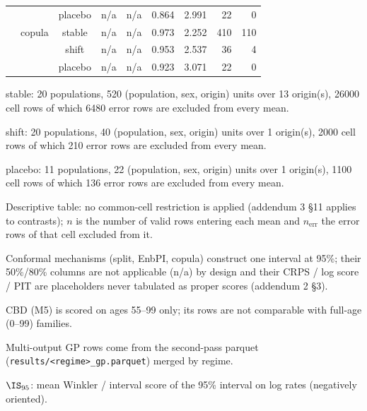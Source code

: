 {\begin{longtable}{@{}llcrrrrrr@{}}
 &  & placebo & n/a & n/a & 0.864 & 2.991 & 22 & 0 \\
 & copula & stable & n/a & n/a & 0.973 & 2.252 & 410 & 110 \\
 &  & shift & n/a & n/a & 0.953 & 2.537 & 36 & 4 \\
 &  & placebo & n/a & n/a & 0.923 & 3.071 & 22 & 0 \\
\end{longtable}
\noindent\begin{minipage}{\linewidth}\scriptsize\raggedright
\noindent stable: 20 populations, 520 (population, sex, origin) units over 13 origin(s), 26000 cell rows of which 6480 error rows are excluded from every mean.\par
\noindent shift: 20 populations, 40 (population, sex, origin) units over 1 origin(s), 2000 cell rows of which 210 error rows are excluded from every mean.\par
\noindent placebo: 11 populations, 22 (population, sex, origin) units over 1 origin(s), 1100 cell rows of which 136 error rows are excluded from every mean.\par
\noindent Descriptive table: no common-cell restriction is applied (addendum 3 \S11 applies to contrasts); $n$ is the number of valid rows entering each mean and $n_{\mathrm{err}}$ the error rows of that cell excluded from it.\par
\noindent Conformal mechanisms (split, EnbPI, copula) construct one interval at 95\%; their 50\%/80\% columns are not applicable (n/a) by design and their CRPS / log score / PIT are placeholders never tabulated as proper scores (addendum 2 \S3).\par
\noindent CBD (M5) is scored on ages 55--99 only; its rows are not comparable with full-age (0--99) families.\par
\noindent Multi-output GP rows come from the second-pass parquet (\texttt{results/<regime>\_gp.parquet}) merged by regime.\par
\noindent $\IS_{95}$: mean Winkler / interval score of the 95\% interval on log rates (negatively oriented).\par
\end{minipage}}
